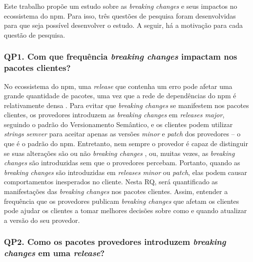 Este trabalho propõe um estudo sobre as \textit{breaking changes} e seus impactos no ecossistema do \gls{npm}. Para isso, três questões de pesquisa foram desenvolvidas para que seja possível desenvolver o estudo. A seguir, há a motivação para cada questão de pesquisa.

\subsubsection{QP1. Com que frequência \textit{breaking changes} impactam nos pacotes clientes?}

No ecossistema do \gls{npm}, uma \textit{release} que contenha um erro pode afetar uma grande quantidade de pacotes, uma vez que a rede de dependências do npm é relativamente densa \cite{teorical_reference:npm_2}. Para evitar que \textit{breaking changes} se manifestem nos pacotes clientes, os provedores introduzem as \textit{breaking changes} em \textit{releases major}, seguindo o padrão do Versionamento Semântico, e os clientes podem utilizar \textit{strings semver} para aceitar apenas as versões \textit{minor} e \textit{patch} dos provedores -- o que é o padrão do \gls{npm}. Entretanto, nem sempre o provedor é capaz de distinguir se suas alterações são ou não \textit{breaking changes} \cite{noregrets2018}, ou, muitas vezes, as \textit{breaking changes} são introduzidas sem que o provedores percebam. Portanto, quando as \textit{breaking changes} são introduzidas em \textit{releases minor} ou \textit{patch}, elas podem causar comportamentos inesperados no cliente. Nesta RQ, será quantificado as manifestações das \textit{breaking changes} nos pacotes clientes. Assim, entender a frequência que os provedores publicam \textit{breaking changes} que afetam os clientes pode ajudar os clientes a tomar melhores decisões sobre como e quando atualizar a versão do seu provedor.

\subsubsection{QP2. Como os pacotes provedores introduzem \textit{breaking changes} em uma \textit{release}?}


